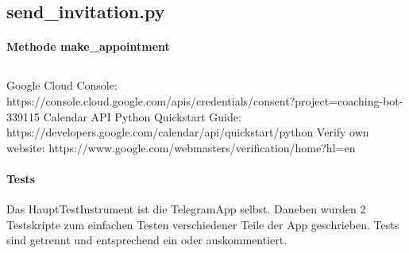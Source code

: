             

        
        \subsection{send\_invitation.py}
            \paragraph{Methode make\_appointment}
        
        
        
        
        \subsection{}



    Google Cloud Console: https://console.cloud.google.com/apis/credentials/consent?project=coaching-bot-339115 
    Calendar API Python Quickstart Guide: https://developers.google.com/calendar/api/quickstart/python 
    Verify own website: https://www.google.com/webmasters/verification/home?hl=en
    
    
    \paragraph{Tests}
    Das Haupt\-Test\-Instrument ist die Telegram\-App selbst. Daneben wurden 2 Testskripte zum einfachen Testen verschiedener Teile der App geschrieben. Tests sind getrennt und entsprechend ein\- oder auskommentiert. 